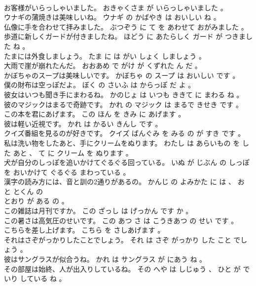 \documentclass[8pt]{extreport}
\begin{document}
\begin{CJK}{UTF8}{min}
\\	お客様がいらっしゃいました。	おきゃくさま が いらっしゃいました 。 
\\	ウナギの蒲焼きは美味しいね。	ウナギ の かばやき は おいしい ね 。 
\\	仏像に手を合わせて拝みました。	ぶつぞう に て を あわせて おがみました 。 
\\	歩道に新しくガードが付きましたね。	ほどう に あたらしく ガード が つきました ね 。 
\\	たまには外食しましょう。	たま に は がい しょく しましょう 。 
\\	大雨で崖が崩れたんだ。	おおあめ で がけ が くずれた ん だ 。 
\\	かぼちゃのスープは美味しいです。	かぼちゃ の スープ は おいしい です 。 
\\	僕の財布は空っぽだよ。	ぼく の さいふ は からっぽ だ よ 。 
\\	彼女はいつも聞き手にまわるね。	かのじょ は いつも ききて に まわる ね 。 
\\	彼のマジックはまるで奇跡です。	かれ の マジック は まるで きせき です 。 
\\	この本を君にあげます。	この ほん を きみ に あげます 。 
\\	彼は軽い近視です。	かれ は かるい きんし です 。 
\\	クイズ番組を見るのが好きです。	クイズ ばんぐみ を みる の が すき です 。 
\\	私は洗い物をしたあと、手にクリームをぬります。	わたし は あらいもの を した あと 、 て に クリーム を ぬります 。 
\\	犬が自分のしっぽを追いかけてぐるぐる回っている。	いぬ が じぶん の しっぽ を おいかけて ぐるぐる まわっている 。 
\\	漢字の読み方には、音と訓の2通りがあるの。	かんじ の よみかた に は 、 お と とくん の 
\\	とおり が ある の 。 
\\	この雑誌は月刊ですか。	この ざっし は げっかん です か 。 
\\	この暑さは高気圧のせいです。	この あつ さ は こうきあつ の せい です 。 
\\	こちらを差し上げます。	こちら を さしあげます 。 
\\	それはさぞがっかりしたことでしょう。	それ は さぞ がっかり した こと でしょう 。 
\\	彼はサングラスが似合うね。	かれ は サングラス が にあう ね 。 
\\	その部屋は始終、人が出入りしているね。	その へや は しじゅう 、 ひと が でいり している ね 。 

\end{CJK}
\end{document}
